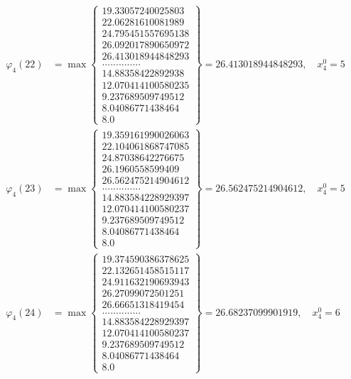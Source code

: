 \documentclass{article}
\begin{document}
\begin{align*}
  
  
  
\varphi_{4}(22) &= \max \left\{ \begin{array}{c}
19.33057240025803 \\
 22.06281610081989 \\
 24.795451557695138 \\
 26.092017890650972 \\
 26.413018944848293 \\
 .............. \\
 14.88358422892938 \\
 12.070414100580235 \\
 9.237689509749512 \\
 8.04086771438464 \\
 8.0
\end{array} \right\} = 26.413018944848293, \quad x_{4}^0 = 5\\
  
  
  
  
\varphi_{4}(23) &= \max \left\{ \begin{array}{c}
19.359161990026063 \\
 22.104061868747085 \\
 24.87038642276675 \\
 26.1960558599409 \\
 26.562475214904612 \\
 .............. \\
 14.883584228929397 \\
 12.070414100580237 \\
 9.237689509749512 \\
 8.04086771438464 \\
 8.0
\end{array} \right\} = 26.562475214904612, \quad x_{4}^0 = 5\\
  
  
  
  
\varphi_{4}(24) &= \max \left\{ \begin{array}{c}
19.374590386378625 \\
 22.132651458515117 \\
 24.911632190693943 \\
 26.27099072501251 \\
 26.66651318419454 \\
 .............. \\
 14.883584228929397 \\
 12.070414100580237 \\
 9.237689509749512 \\
 8.04086771438464 \\
 8.0
\end{array} \right\} = 26.68237099901919, \quad x_{4}^0 = 6\\
  

\end{align*}
\end{document}
